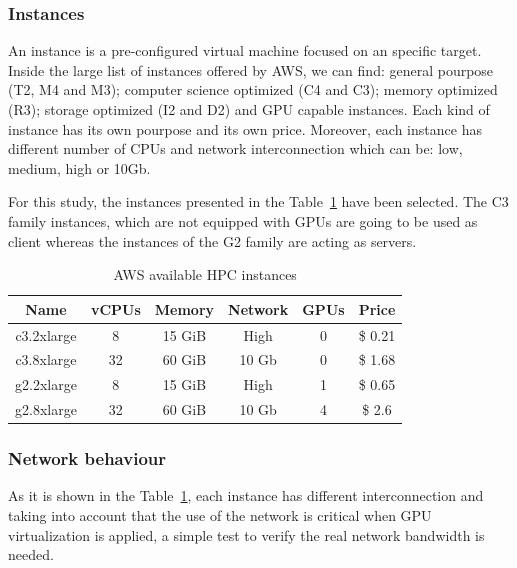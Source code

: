 \documentclass[a4paper,twoside]{article}
\begin{document}
\subsubsection{Instances}

An instance is a pre-configured virtual machine focused on an 
specific target. Inside the large list of instances offered by AWS, 
we can find: general pourpose (T2, M4 and M3); computer science optimized 
(C4 and C3); memory optimized (R3); storage optimized (I2 and D2) and 
GPU capable instances. Each kind of instance has its own pourpose and its 
own price. Moreover, each instance has different number of CPUs and network 
interconnection which can be: low, medium, high or 10Gb.

For this study, the instances presented in the Table~\ref{table:awsInstances} 
have been selected. The C3 family instances, which are not equipped with 
GPUs are going to be used as client whereas the instances of the G2 family are 
acting as servers.   

\begin{table}[!t]
\renewcommand{\arraystretch}{1.3}
\caption{AWS available HPC instances}
\label{table:awsInstances}
\tabcolsep=0.09cm
\begin{center}\begin{tabular}{cccccc}
Name & vCPUs & Memory & Network & GPUs & Price\\ \hline \hline
c3.2xlarge & 8 & 15 GiB & High & 0 & \$ 0.21\\ \hline
c3.8xlarge & 32 & 60 GiB & 10 Gb & 0 & \$ 1.68 \\ \hline
g2.2xlarge & 8 & 15 GiB & High & 1 & \$ 0.65\\ \hline
g2.8xlarge & 32 & 60 GiB & 10 Gb & 4 & \$ 2.6 \\ \hline
\end{tabular}\end{center}\end{table}

\subsubsection{Network behaviour}
As it is shown in the Table~\ref{table:awsInstances}, each instance has different 
interconnection and taking into account that the use of the network 
is critical when GPU virtualization is applied, a simple test to verify the 
real network bandwidth is needed.
\end{document}

